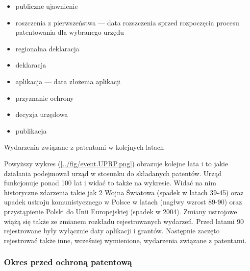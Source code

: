 \begin{multicols}{2}

\begin{itemize}
\item publiczne ujawnienie 
\item roszczenia z pierwszeństwa  --- 
      data rozszczenia sprzed rozpoczęcia procesu patentowania dla wybranego urzędu
\item regionalna deklaracja 
\item deklaracja 
\item aplikacja  --- data złożenia aplikacji
\item przyznanie ochrony 
\item decyzja urzędowa
\item publikacja
\end{itemize}

\columnbreak
{}
{Wydarzenia związane z patentami w kolejnych latach}

\end{multicols}

Powyższy wykres (\ref{../fig/event.UPRP.png}) obrazuje kolejne lata i to jakie
działania podejmował urząd w stosunku do składanych patentów. Urząd funkcjonuje
ponad 100 lat i widać to także na wykresie.
Widać na nim historyczne zdarzenia takie jak 2 Wojna Światowa (spadek w latach 39-45) 
oraz upadek ustroju komunistycznego w Polsce w latach (nagłwy wzrost 89-90) oraz
przystąpienie Polski do Unii Europejskiej (spadek w 2004).
Zmiany ustrojowe wiążą się także ze zmianem rozkładu rejestrowanych wydarzeń.
Przed latami 90 rejestrowane były wyłącznie daty aplikacji i grantów.
Następnie zaczęto rejestrować także inne, wcześniej wymienione, 
wydarzenia związane z patentami.



\subsubsection{Okres przed ochroną patentową}

\begin{multicols}{2}
\columnbreak
{}
\end{multicols}



